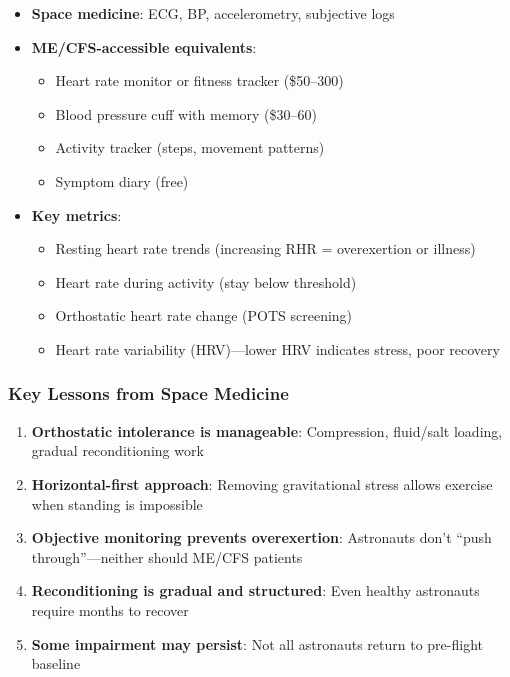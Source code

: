 \begin{itemize}
    \item \textbf{Space medicine}: ECG, BP, accelerometry, subjective logs
    \item \textbf{ME/CFS-accessible equivalents}:
    \begin{itemize}
        \item Heart rate monitor or fitness tracker (\$50--300)
        \item Blood pressure cuff with memory (\$30--60)
        \item Activity tracker (steps, movement patterns)
        \item Symptom diary (free)
    \end{itemize}
    \item \textbf{Key metrics}:
    \begin{itemize}
        \item Resting heart rate trends (increasing RHR = overexertion or illness)
        \item Heart rate during activity (stay below threshold)
        \item Orthostatic heart rate change (POTS screening)
        \item Heart rate variability (HRV)---lower HRV indicates stress, poor recovery
    \end{itemize}
\end{itemize}

\subsubsection{Key Lessons from Space Medicine}

\begin{enumerate}
    \item \textbf{Orthostatic intolerance is manageable}: Compression, fluid/salt loading, gradual reconditioning work
    \item \textbf{Horizontal-first approach}: Removing gravitational stress allows exercise when standing is impossible
    \item \textbf{Objective monitoring prevents overexertion}: Astronauts don't ``push through''---neither should ME/CFS patients
    \item \textbf{Reconditioning is gradual and structured}: Even healthy astronauts require months to recover
    \item \textbf{Some impairment may persist}: Not all astronauts return to pre-flight baseline
\end{enumerate}

